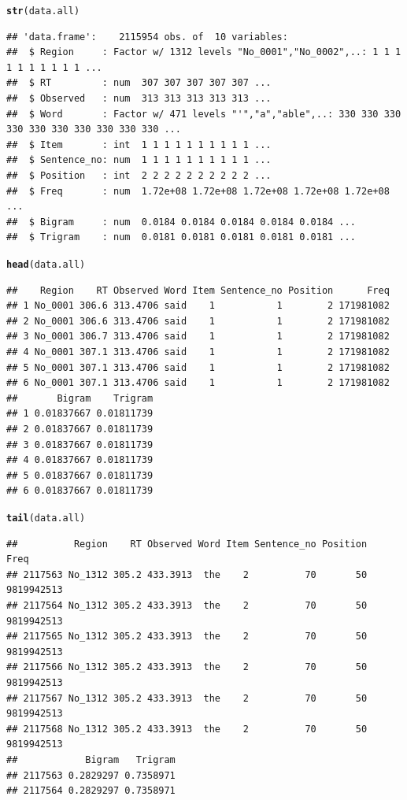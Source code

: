 \documentclass{article}\usepackage[]{graphicx}\usepackage[]{color}
\makeatletter
\newcommand{\hlstd}[1]{\textcolor[rgb]{0.345,0.345,0.345}{#1}}%
\newcommand{\hlkwd}[1]{\textcolor[rgb]{0.737,0.353,0.396}{\textbf{#1}}}%
\newenvironment{kframe}{%
 \def\at@end@of@kframe{}%
 \ifinner\ifhmode%
  \def\at@end@of@kframe{\end{minipage}}%
  \begin{minipage}{\columnwidth}%
 \fi\fi%
 \def\FrameCommand##1{\hskip\@totalleftmargin \hskip-\fboxsep
 \colorbox{shadecolor}{##1}\hskip-\fboxsep
     \hskip-\linewidth \hskip-\@totalleftmargin \hskip\columnwidth}%
 \MakeFramed {\advance\hsize-\width
   \@totalleftmargin\z@ \linewidth\hsize
   \@setminipage}}%
 {\par\unskip\endMakeFramed%
 \at@end@of@kframe}
\newenvironment{knitrout}{}{} %
\makeatother
\begin{document}
\begin{knitrout}
\begin{kframe}
\begin{alltt}
\hlkwd{str}\hlstd{(data.all)}
\end{alltt}
\begin{verbatim}
## 'data.frame':	2115954 obs. of  10 variables:
##  $ Region     : Factor w/ 1312 levels "No_0001","No_0002",..: 1 1 1 1 1 1 1 1 1 1 ...
##  $ RT         : num  307 307 307 307 307 ...
##  $ Observed   : num  313 313 313 313 313 ...
##  $ Word       : Factor w/ 471 levels "'","a","able",..: 330 330 330 330 330 330 330 330 330 330 ...
##  $ Item       : int  1 1 1 1 1 1 1 1 1 1 ...
##  $ Sentence_no: num  1 1 1 1 1 1 1 1 1 1 ...
##  $ Position   : int  2 2 2 2 2 2 2 2 2 2 ...
##  $ Freq       : num  1.72e+08 1.72e+08 1.72e+08 1.72e+08 1.72e+08 ...
##  $ Bigram     : num  0.0184 0.0184 0.0184 0.0184 0.0184 ...
##  $ Trigram    : num  0.0181 0.0181 0.0181 0.0181 0.0181 ...
\end{verbatim}
\begin{alltt}
\hlkwd{head}\hlstd{(data.all)}
\end{alltt}
\begin{verbatim}
##    Region    RT Observed Word Item Sentence_no Position      Freq
## 1 No_0001 306.6 313.4706 said    1           1        2 171981082
## 2 No_0001 306.6 313.4706 said    1           1        2 171981082
## 3 No_0001 306.7 313.4706 said    1           1        2 171981082
## 4 No_0001 307.1 313.4706 said    1           1        2 171981082
## 5 No_0001 307.1 313.4706 said    1           1        2 171981082
## 6 No_0001 307.1 313.4706 said    1           1        2 171981082
##       Bigram    Trigram
## 1 0.01837667 0.01811739
## 2 0.01837667 0.01811739
## 3 0.01837667 0.01811739
## 4 0.01837667 0.01811739
## 5 0.01837667 0.01811739
## 6 0.01837667 0.01811739
\end{verbatim}
\begin{alltt}
\hlkwd{tail}\hlstd{(data.all)}
\end{alltt}
\begin{verbatim}
##          Region    RT Observed Word Item Sentence_no Position       Freq
## 2117563 No_1312 305.2 433.3913  the    2          70       50 9819942513
## 2117564 No_1312 305.2 433.3913  the    2          70       50 9819942513
## 2117565 No_1312 305.2 433.3913  the    2          70       50 9819942513
## 2117566 No_1312 305.2 433.3913  the    2          70       50 9819942513
## 2117567 No_1312 305.2 433.3913  the    2          70       50 9819942513
## 2117568 No_1312 305.2 433.3913  the    2          70       50 9819942513
##            Bigram   Trigram
## 2117563 0.2829297 0.7358971
## 2117564 0.2829297 0.7358971

\end{verbatim}
\end{kframe}
\end{knitrout}
\end{document}
